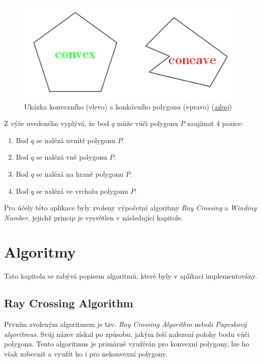 \documentclass[a4paper, 12pt]{article}
\begin{document}
\begin{figure}[h!]
	\centering
	\includegraphics[width=13cm]{./pictures/convex_concave.png}
	\caption{Ukázka konvexního (vlevo) a konkávního polygonu (vpravo) (\href{https://www.nextgurukul.in/nganswers/ask-question/answer/What-is-concave-38-convex-polygon-/Understanding-Quadrilaterals/75323.htm}{\textsl{zdroj}})}
\end{figure}

Z výše uvedeného vyplývá, že bod $q$ může vůči polygonu $P$ zaujímat 4 pozice:
\begin{enumerate}
\item Bod $q$ se nalézá uvnitř polygonu $P$.
\item Bod $q$ se nalézá vně polygonu $P$.
\item Bod $q$ se nalézá na hraně polygonu $P$.
\item Bod $q$ se nalézá ve vrcholu polygonu $P$.
\end{enumerate}

Pro účely této aplikace byly zvoleny výpočetní algoritmy \textit{Ray Crossing} a \textit{Winding Number}, jejichž princip je vysvětlen v následující kapitole.

\section{Algoritmy}
Tato kapitola se zabývá popisem algoritmů, které byly v aplikaci implementovány. 

\subsection{Ray Crossing Algorithm}
Prvním zvoleným algoritmem je tzv. \textit{Ray Crossing Algorithm} neboli \textit{Paprskový algoritmus}. Svůj název získal po způsobu, jakým řeší nalezení polohy bodu vůči polygonu. Tento algoritmus je primárně využíván pro konvexní polygony, lze ho však zobecnit a využít ho i pro nekonvexní polygony. 
\end{document}
